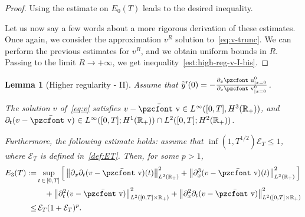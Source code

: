 \documentclass[10pt]{amsart}
\newtheorem{lemm}[theo]{Lemma}\newtheorem{prop}[theo]{Proposition}\newtheorem{coro}[theo]{Corollary}\newtheorem{conj}[theo]{Conjecture}
\theoremstyle{definition}\newtheorem{defi}[theo]{Definition}\newtheorem{rema}[theo]{Remark}\newtheorem{exam}[theo]{Example}\newtheorem{exem}[theo]{Example}\newtheorem{nota}[theo]{Notation}
\newcommand{\mathpzc}[1]{\text{\pzcfont #1}}
\newcommand{\R}{\mathbb{R}}
\newcommand{\p}{\partial}
\newcommand{\bv}{\bar{\mathpzc{v}}}
\newcommand{\cE}{\mathcal E}
\newcommand{\tv}{\mathpzc{v}}
\newcommand{\tu}{\mathpzc{u}}
\newcommand{\ty}{\widetilde{y}}
\begin{document}
\begin{proof}
Using the estimate on $E_0(T)$ leads to the desired inequality.



Let us now say a few words about a more rigorous derivation of these estimates. Once again, we consider the approximation $v^R$ solution to~\eqref{eq:v-trunc}. We can perform the previous estimates for $v^R$, and we obtain uniform bounds in $R$. Passing to the limit $R\to +\infty$, we get inequality~\eqref{est:high-reg-v-I-bis}.
\end{proof}


\begin{lemm}[Higher regularity - II]\label{lem:Hreg-v-2}
Assume that $\ty'(0)= - \frac{\p_x \tu^0_{|x=0}}{\partial_x \tv^0_{|x=0}}$.


The solution $v$ of~\eqref{eq:v} satisfies $v -\bv \in L^\infty([0,T], H^3(\R_+))$, and $\partial_t(v-\bv) \in L^\infty([0,T];H^1(\R_+)) \cap L^2([0,T]; H^2(\R_+))$.

Furthermore, the following estimate holds: assume that $\inf(1, T^{1/2}) \cE_T\leq 1$, where $\cE_T$ is defined in~\eqref{def:ET}. Then, for some $p> 1$,
\begin{equation}\label{est:high-reg-v-II-bis}
\begin{split}
 E_3(T) :=& \sup_{t\,\in\,[0,T]} \Big[\left\|\partial_x \partial_t (v-\bv)(t)\right\|_{L^2(\R_+)}^2 + \left\|\partial^3_x (v-\bv)(t)\right\|_{L^2(\R_+)}^2 \Big]\\
& \quad + \left\|\partial^2_t(v-\bv)\right\|_{L^2([0,T] \times \R_+)}^2 + \left\|\partial^2_x \partial_t (v-\bv)\right\|_{L^2([0,T] \times \R_+)}^2 \\
 \leq&\, \cE_T(1+\cE_T)^p.
\end{split}
\end{equation}
\end{lemm}
\end{document}
